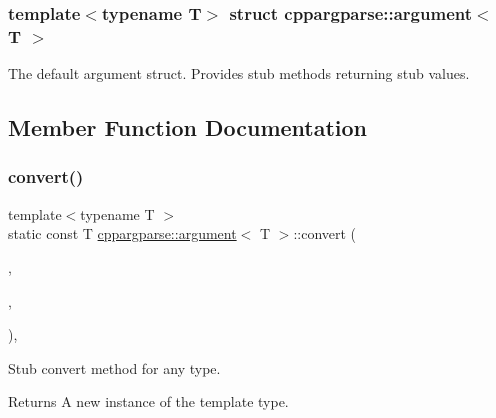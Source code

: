 \subsubsection*{template$<$typename T$>$\newline
struct cppargparse\+::argument$<$ T $>$}

The default argument struct. Provides stub methods returning stub values. 

\subsection{Member Function Documentation}
\mbox{\label{structcppargparse_1_1argument_a15705823db542d0e79b27298f4723ef6}} 
\subsubsection{\texorpdfstring{convert()}{convert()}}
{\footnotesize\ttfamily template$<$typename T $>$ \\
static const T \hyperlink{structcppargparse_1_1argument}{cppargparse\+::argument}$<$ T $>$\+::convert (\begin{DoxyParamCaption}\item[{const types\+::\+Command\+Line\+\_\+t \&}]{,  }\item[{const types\+::\+Command\+Line\+Argument\+\_\+t \&}]{,  }\item[{const types\+::\+Command\+Line\+Arguments\+Map\+\_\+t \&}]{ }\end{DoxyParamCaption})\hspace{0.3cm}{\ttfamily [inline]}, {\ttfamily [static]}}



Stub convert method for any type. 

\begin{DoxyReturn}{Returns}
A new instance of the template type. 
\end{DoxyReturn}
\mbox{\label{structcppargparse_1_1argument_aabd56cfa910d9e3d60b009f593b123a6}} 
